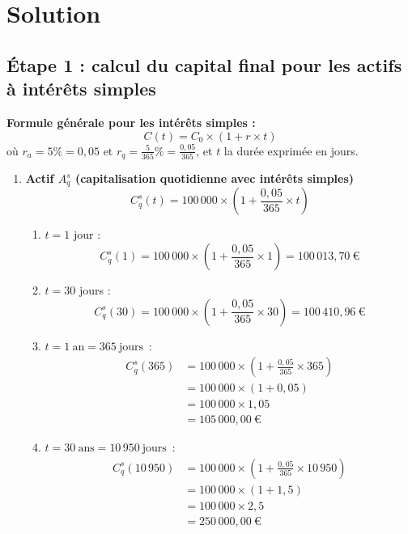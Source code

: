 \documentclass{article}
\begin{document}
\newpage
\section{Solution}
\subsection*{Étape 1 : calcul du capital final pour les actifs à intérêts simples}

\noindent
\textbf{Formule générale pour les intérêts simples :}
\[
C(t) = C_0 \times \left(1 + r \times t\right)
\]
où $r_a = 5\% = 0,05$ et \( r_q = \frac{5}{365}\% = \frac{0,05}{365} \), et \( t \) la durée exprimée en jours.

\begin{enumerate}[label=\textbf{Q\arabic*.}]
    \item \textbf{Actif \( A_q^s \) (capitalisation quotidienne avec intérêts simples)}
    \[
    C_q^s(t) = 100\,000 \times \left(1 + \frac{0,05}{365} \times t\right)
    \]
    \begin{enumerate}[label=(\alph*)]
        \item \( t = 1 \) jour : 
        \[
        C_q^s(1) = 100\,000 \times \left(1 + \frac{0,05}{365} \times 1\right) = \boxed{100\,013,70\ \text{€}}
        \]
        
        \item $t = 30$ jours : 
        \[
        C_q^s(30) = 100\,000 \times \left(1 + \frac{0,05}{365} \times 30\right) = \boxed{100\,410,96\ \text{€}}
        \]
        
        \item $t = 1\ \text{an} = 365\ \text{jours}$~: 
        \begin{align*}
        C_q^s(365) &= 100\,000 \times \left(1 + \frac{0,05}{365} \times 365\right) \\
                 &= 100\,000 \times (1 + 0,05) \\
                 &= 100\,000 \times 1,05 \\
                 &= \boxed{105\,000,00\ \text{€}}
        \end{align*}
        
        \item $t = 30\ \text{ans} = 10\,950\ \text{jours}$~: 
        \begin{align*}
        C_q^s(10\,950) &= 100\,000 \times \left(1 + \frac{0,05}{365} \times 10\,950\right) \\
                &= 100\,000 \times (1 + 1,5) \\
                 &= 100\,000 \times 2,5 \\
                 &= \boxed{250\,000,00\ \text{€}}
        \end{align*}
        

\end{enumerate}
\end{enumerate}
\end{document}
